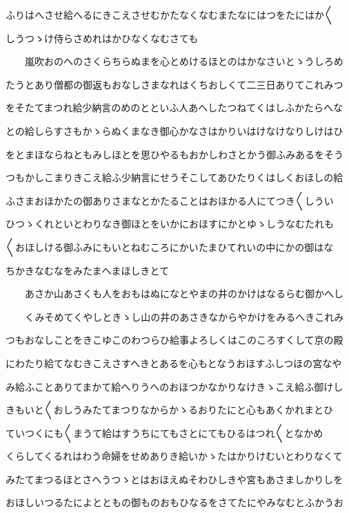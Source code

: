 \documentclass[a4paper,11pt,landscape]{ltjtarticle}
\begin{document}
ふりはへさせ給へるにきこえさせむかたなくなむまたなにはつをたにはか〱
\par\medskip
しうつゝけ侍らさめれはかひなくなむさても
\par\medskip
　　嵐吹おのへのさくらちらぬまを心とめけるほとのはかなさいとゝうしろめ
\par\medskip
たうとあり僧都の御返もおなしさまなれはくちおしくて二三日ありてこれみつ
\par\medskip
をそたてまつれ給少納言のめのとといふ人あへしたつねてくはしふかたらへな
\par\medskip
との給しらすさもかゝらぬくまなき御心かなさはかりいはけなけなりしけはひ
\par\medskip
をとまほならねともみしほとを思ひやるもおかしわさとかう御ふみあるをそう
\par\medskip
つもかしこまりきこえ給ふ少納言にせうそこしてあひたりくはしくおほしの給
\par\medskip
ふさまおほかたの御ありさまなとかたることはおほかる人にてつき〱しうい
\par\medskip
ひつゝくれといとわりなき御ほとをいかにおほすにかとゆゝしうなむたれも
\par\medskip
〱おほしける御ふみにもいとねむころにかいたまひてれいの中にかの御はな
\par\medskip
ちかきなむなをみたまへまほしきとて
\par\medskip
　　あさか山あさくも人をおもはぬになとやまの井のかけはなるらむ御かへし
\par\medskip
　　くみそめてくやしときゝし山の井のあさきなからやかけをみるへきこれみ
\par\medskip
つもおなしことをきこゆこのわつらひ給事よろしくはこのころすくして京の殿
\par\medskip
にわたり給てなむきこえさすへきとあるを心もとなうおほすふしつほの宮なや
\par\medskip
み給ふことありてまかて給へりうへのおほつかなかりなけきゝこえ給ふ御けし
\par\medskip
きもいと〱おしうみたてまつりなからかゝるおりたにと心もあくかれまとひ
\par\medskip
ていつくにも〱まうて給はすうちにてもさとにてもひるはつれ〱となかめ
\par\medskip
くらしてくるれはわう命婦をせめありき給いかゝたはかりけむいとわりなくて
\par\medskip
みたてまつるほとさへうつゝとはおほえぬそわひしきや宮もあさましかりしを
\par\medskip
おほしいつるたによとともの御ものおもひなるをさてたにやみなむとふかうお
\par\medskip
\end{document}
